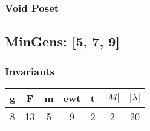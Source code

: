 \documentclass[a4paper]{article}
\begin{document}
\hfill\begin{minipage}{0.48\textwidth}
\subsubsection*{Void Poset}
\centering
{}
\end{minipage}
\newpage\subsection{MinGens: [5, 7, 9]}
\noindent\begin{minipage}{0.6\textwidth}
\subsubsection*{Invariants}
\centering
\begin{tabular}{|c|c|c|c|c|c|c|}
\toprule
g & F & m & ewt & t & \(|M|\) & \(|\lambda|\) \\
\midrule
8 & 13 & 5 & 9 & 2 & 2 & 20 \\
\bottomrule
\end{tabular}
\end{minipage}%
\end{document}
